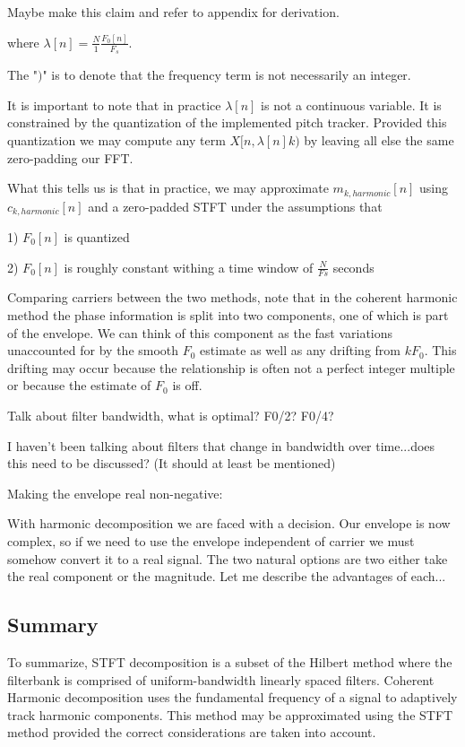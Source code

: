 \documentclass [11pt, proquest] {uwthesis}[2015/03/03]
\begin{document}
Maybe make this claim and refer to appendix for derivation.


where $\lambda[n] = \frac{N}{1} \frac{F_0[n]}{F_s}$.

The "$)$" is to denote that the frequency term is not necessarily an integer.

It is important to note that in practice $\lambda[n]$ is not a continuous variable.  It is constrained by the quantization of the implemented pitch tracker.  Provided this quantization we may compute any term $X[n, \lambda[n]k)$ by leaving all else the same zero-padding our FFT.

What this tells us is that in practice, we may approximate $m_{k,harmonic}[n]$ using $c_{k,harmonic}[n]$ and a zero-padded STFT under the assumptions that

1) $F_0[n]$ is quantized

2) $F_0[n]$ is roughly constant withing a time window of $\frac{N}{Fs}$ seconds

Comparing carriers between the two methods, note that in the coherent harmonic method the phase information is split into two components, one of which is part of the envelope.  We can think of this component as the fast variations unaccounted for by the smooth $F_0$ estimate as well as any drifting from $kF_0$.  This drifting may occur because the relationship is often not a perfect integer multiple or because the estimate of $F_0$ is off.

Talk about filter bandwidth, what is optimal? F0/2? F0/4?

I haven't been talking about filters that change in bandwidth over time...does this need to be discussed?  (It should at least be mentioned)

Making the envelope real non-negative:

With harmonic decomposition we are faced with a decision.  Our envelope is now complex, so if we need to use the envelope independent of carrier we must somehow convert it to a real signal.  The two natural options are two either take the real component or the magnitude.  Let me describe the advantages of each...

\subsection{Summary}

To summarize, STFT decomposition is a subset of the Hilbert method where the filterbank is comprised of uniform-bandwidth linearly spaced filters.  Coherent Harmonic decomposition uses the fundamental frequency of a signal to adaptively track harmonic components.  This method may be approximated using the STFT method provided the correct considerations are taken into account.
\end{document}
